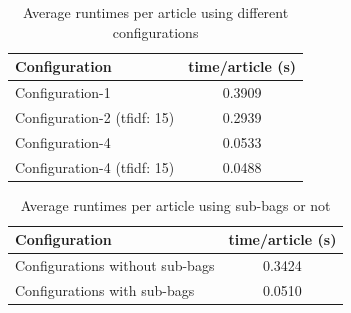 \begin{center}
\begin{table}
  \begin{tabular}{|l|c|}
    \hline
    Configuration & time/article (s)  \\ \hline
    Configuration-1                     & 0.3909 \\ \hline
    Configuration-2 (tfidf: 15)         & 0.2939 \\ \hline
    Configuration-4                     & 0.0533 \\ \hline
    Configuration-4 (tfidf: 15)         & 0.0488 \\ \hline
  \end{tabular}
  \caption{Average runtimes per article using different configurations}
  \label{tab:benchmark1}
\end{table}
\end{center}

\begin{center}
\begin{table}
  \begin{tabular}{|l|c|}
    \hline
    Configuration & time/article (s)             \\ \hline
    Configurations without sub-bags     & 0.3424 \\ \hline
    Configurations with sub-bags        & 0.0510 \\ \hline
  \end{tabular}
  \caption{Average runtimes per article using sub-bags or not}
  \label{tab:benchmark2}
\end{table}
\end{center}

